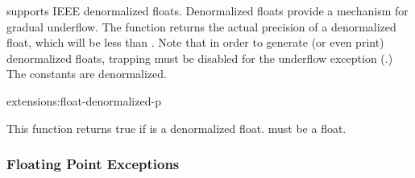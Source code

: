 \cmucl{} supports IEEE denormalized floats.  Denormalized floats
provide a mechanism for gradual underflow.  The \clisp{}
 function returns the actual precision of a
denormalized float, which will be less than .
Note that in order to generate (or even print) denormalized floats,
trapping must be disabled for the underflow exception
(.)  The \clisp{}
 constants are
denormalized.

\begin{defun}{extensions:}{float-denormalized-p}{}
  
  This function returns true if  is a denormalized float.
   must be a float.
\end{defun}


\subsubsection{Floating Point Exceptions}
\label{float-traps}

